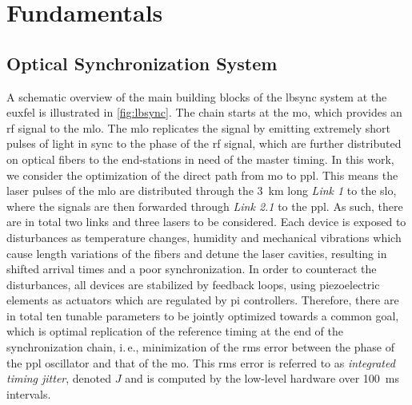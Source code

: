 \documentclass{ifacconf}
\newcommand{\ie}{i.\,e., }
\begin{document}
\section{Fundamentals} \label{sec:fundamentals}


\subsection{Optical Synchronization System}
A schematic overview of the main building blocks of the \gls{lbsync} system at the \gls{euxfel} is illustrated in \cref{fig:lbsync}.
The chain starts at the \gls{mo}, which provides an \gls{rf} signal to the \gls{mlo}. The \gls{mlo} replicates the signal by emitting extremely short pulses of light in sync to the phase of the \gls{rf} signal, which are further distributed on optical fibers to the end-stations in need of the master timing. In this work, we consider the optimization of the direct path from \gls{mo} to \gls{ppl}. This means the laser pulses of the \gls{mlo} are distributed through the \SI{3}{\kilo\meter} long \emph{Link 1} to the \gls{slo}, where the signals are then forwarded through \emph{Link 2.1} to the \gls{ppl}. As such, there are in total two links and three lasers to be considered. Each device is exposed to disturbances as temperature changes, humidity and mechanical vibrations which cause length variations of the fibers and detune the laser cavities, resulting in shifted arrival times and a poor synchronization. In order to counteract the disturbances, all devices are stabilized by feedback loops, using piezoelectric elements as actuators which are regulated by \gls{pi} controllers. Therefore, there are in total ten tunable parameters to be jointly optimized towards a common goal, which is optimal replication of the reference timing at the end of the synchronization chain, \ie minimization of the \gls{rms} error between the phase of the \gls{ppl} oscillator and that of the \gls{mo}. This \gls{rms} error is referred to as \emph{integrated timing jitter}, denoted \(J\) and is computed by the low-level hardware over \SI{100}{\milli\second} intervals.
\end{document}

